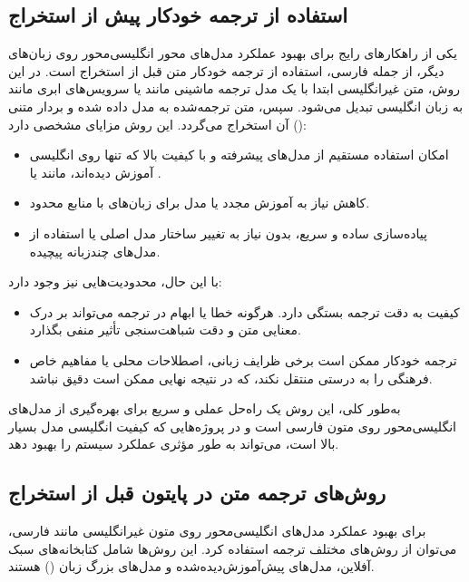 \documentclass{article}
\begin{document}
\subsection{استفاده از ترجمه خودکار پیش از استخراج }
یکی از راهکارهای رایج برای بهبود عملکرد مدل‌های  محور انگلیسی‌محور روی زبان‌های دیگر، از جمله فارسی، استفاده از ترجمه خودکار متن قبل از استخراج  است.
در این روش، متن غیرانگلیسی ابتدا با یک مدل ترجمه ماشینی مانند  یا سرویس‌های ابری مانند  به زبان انگلیسی تبدیل می‌شود.
سپس، متن ترجمه‌شده به مدل  داده شده و بردار متنی () آن استخراج می‌گردد.
این روش مزایای مشخصی دارد:
\begin{itemize}
\item امکان استفاده مستقیم از مدل‌های پیشرفته و با کیفیت بالا که تنها روی انگلیسی آموزش دیده‌اند، مانند  یا .

\item کاهش نیاز به آموزش مجدد یا  مدل برای زبان‌های با منابع محدود.

\item پیاده‌سازی ساده و سریع، بدون نیاز به تغییر ساختار مدل اصلی یا استفاده از مدل‌های چندزبانه پیچیده.

\end{itemize}

با این حال، محدودیت‌هایی نیز وجود دارد:
\begin{itemize}
\item کیفیت  به دقت ترجمه بستگی دارد.
هرگونه خطا یا ابهام در ترجمه می‌تواند بر درک معنایی متن و دقت شباهت‌سنجی  تأثیر منفی بگذارد.

\item ترجمه خودکار ممکن است برخی ظرایف زبانی، اصطلاحات محلی یا مفاهیم خاص فرهنگی را به درستی منتقل نکند، که در نتیجه  نهایی ممکن است دقیق نباشد.

\end{itemize}

به‌طور کلی، این روش یک راه‌حل عملی و سریع برای بهره‌گیری از مدل‌های انگلیسی‌محور روی متون فارسی است و در پروژه‌هایی که کیفیت  انگلیسی مدل بسیار بالا است، می‌تواند به طور مؤثری عملکرد سیستم را بهبود دهد.

\subsection{روش‌های ترجمه متن در پایتون قبل از استخراج }
برای بهبود عملکرد مدل‌های انگلیسی‌محور روی متون غیرانگلیسی مانند فارسی، می‌توان از روش‌های مختلف ترجمه استفاده کرد.
این روش‌ها شامل کتابخانه‌های سبک آفلاین، مدل‌های پیش‌آموزش‌دیده‌شده و مدل‌های بزرگ زبان () هستند.
\end{document}
